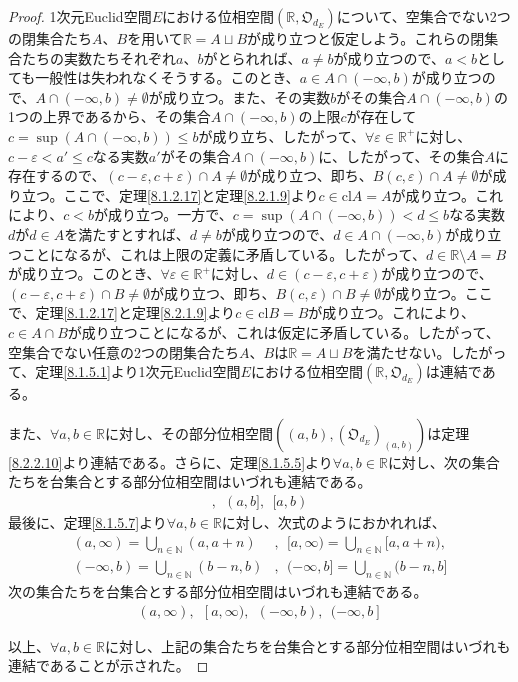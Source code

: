 \documentclass[dvipdfmx]{jsarticle}
\begin{document}
\begin{proof}
1次元Euclid空間$E$における位相空間$\left( \mathbb{R},\mathfrak{O}_{d_{E}} \right)$について、空集合でない2つの閉集合たち$A$、$B$を用いて$\mathbb{R} = A \sqcup B$が成り立つと仮定しよう。これらの閉集合たちの実数たちそれぞれ$a$、$b$がとられれば、$a \neq b$が成り立つので、$a < b$としても一般性は失われなくそうする。このとき、$a \in A \cap ( - \infty,b)$が成り立つので、$A \cap ( - \infty,b) \neq \emptyset$が成り立つ。また、その実数$b$がその集合$A \cap ( - \infty,b)$の1つの上界であるから、その集合$A \cap ( - \infty,b)$の上限$c$が存在して$c = \sup\left( A \cap ( - \infty,b) \right) \leq b$が成り立ち、したがって、$\forall\varepsilon \in \mathbb{R}^{+}$に対し、$c - \varepsilon < a' \leq c$なる実数$a'$がその集合$A \cap ( - \infty,b)$に、したがって、その集合$A$に存在するので、$(c - \varepsilon,c + \varepsilon) \cap A \neq \emptyset$が成り立つ、即ち、$B(c,\varepsilon) \cap A \neq \emptyset$が成り立つ。ここで、定理\ref{8.1.2.17}と定理\ref{8.2.1.9}より$c \in {\mathrm{cl}}A = A$が成り立つ。これにより、$c < b$が成り立つ。一方で、$c = \sup\left( A \cap ( - \infty,b) \right) < d \leq b$なる実数$d$が$d \in A$を満たすとすれば、$d \neq b$が成り立つので、$d \in A \cap ( - \infty,b)$が成り立つことになるが、これは上限の定義に矛盾している。したがって、$d \in \mathbb{R} \setminus A = B$が成り立つ。このとき、$\forall\varepsilon \in \mathbb{R}^{+}$に対し、$d \in (c - \varepsilon,c + \varepsilon)$が成り立つので、$(c - \varepsilon,c + \varepsilon) \cap B \neq \emptyset$が成り立つ、即ち、$B(c,\varepsilon) \cap B \neq \emptyset$が成り立つ。ここで、定理\ref{8.1.2.17}と定理\ref{8.2.1.9}より$c \in {\mathrm{cl}}B = B$が成り立つ。これにより、$c \in A \cap B$が成り立つことになるが、これは仮定に矛盾している。したがって、空集合でない任意の2つの閉集合たち$A$、$B$は$\mathbb{R} = A \sqcup B$を満たせない。したがって、定理\ref{8.1.5.1}より1次元Euclid空間$E$における位相空間$\left( \mathbb{R},\mathfrak{O}_{d_{E}} \right)$は連結である。\par
また、$\forall a,b \in \mathbb{R}$に対し、その部分位相空間$\left( (a,b),\left( \mathfrak{O}_{d_{E}} \right)_{(a,b)} \right)$は定理\ref{8.2.2.10}より連結である。さらに、定理\ref{8.1.5.5}より$\forall a,b \in \mathbb{R}$に対し、次の集合たちを台集合とする部分位相空間はいづれも連結である。
\begin{align*}
[ a,b],\ \ (a,b],\ \ [ a,b)
\end{align*}
最後に、定理\ref{8.1.5.7}より$\forall a,b \in \mathbb{R}$に対し、次式のようにおかれれば、
\begin{align*}
(a,\infty) = \bigcup_{n \in \mathbb{N}} (a,a + n)&,\ \ [ a,\infty) = \bigcup_{n \in \mathbb{N}} [ a,a + n),\\ 
( - \infty,b) = \bigcup_{n \in \mathbb{N}} (b - n,b)&,\ \ ( - \infty,b] = \bigcup_{n \in \mathbb{N}} (b - n,b]
\end{align*}
次の集合たちを台集合とする部分位相空間はいづれも連結である。
\begin{align*}
(a,\infty),\ \ [ a,\infty),\ \ ( - \infty,b),\ \ ( - \infty,b]
\end{align*}\par
以上、$\forall a,b \in \mathbb{R}$に対し、上記の集合たちを台集合とする部分位相空間はいづれも連結であることが示された。
\end{proof}
\end{document}
